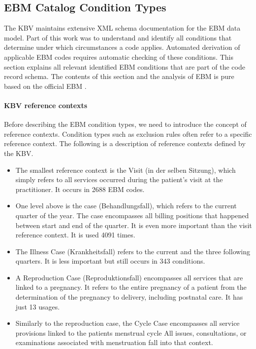 \subsection{EBM Catalog Condition Types}\label{subsec:ebm-conditions}
The KBV maintains extensive XML schema documentation for the EBM data model.
Part of this work was to understand and identify all conditions that determine under which circumstances a code applies.
Automated derivation of applicable EBM codes requires automatic checking of these conditions.
This section explains all relevant identified EBM conditions that are part of the code record schema.
The contents of this section and the analysis of EBM is pure based on the official EBM \cite{hermanns2015ebm}.

\paragraph{KBV reference contexts}\label{par:kbv-reference-contexts}
Before describing the EBM condition types, we need to introduce the concept of reference contexts.
Condition types such as exclusion rules often refer to a specific reference context.
The following is a description of reference contexts defined by the KBV.
\begin{itemize}
    \item The smallest reference context is the Visit (in der selben Sitzung), which simply refers to all services occurred during the patient's visit at the practitioner.
    It occurs in 2688 EBM codes.
    \item One level above is the case (Behandlungsfall), which refers to the current quarter of the year.
     The case encompasses all billing positions that happened between start and end of the quarter.
    It is even more important than the visit reference context.
    It is used 4091 times.
    \item The Illness Case (Krankheitsfall) refers to the current and the three following quarters.
    It is less important but still occurs in 343 conditions.
    \item A Reproduction Case (Reproduktionsfall) encompasses all services that are linked to a pregnancy.
    It refers to the entire pregnancy of a patient from the determination of the pregnancy to delivery, including postnatal care.
    It has just 13 usages.
    \item Similarly to the reproduction case, the Cycle Case encompasses all service provisions linked to the patients menstrual cycle
    All issues, consultations, or examinations associated with menstruation fall into that context.
\end{itemize}
